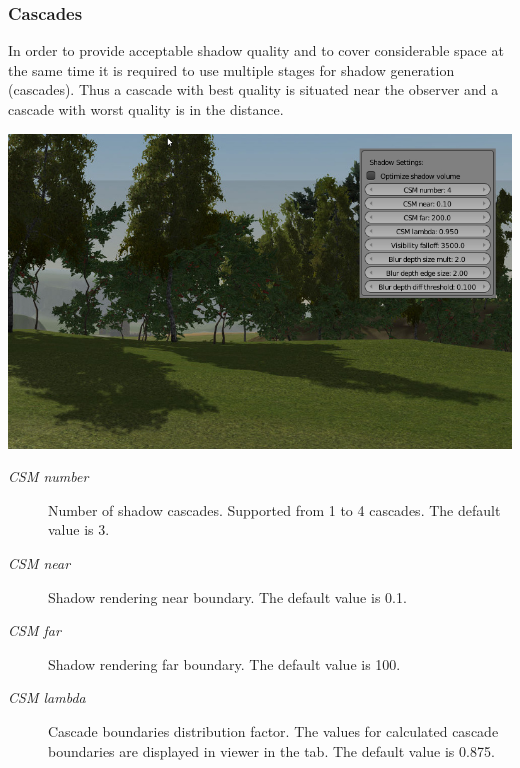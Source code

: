 \documentclass[a4paper,12pt,oneside]{sphinxmanual}
\begin{document}
\subsubsection{Cascades}
\label{lighting:id11}
In order to provide acceptable shadow quality and to cover considerable space at the same time it is required to use multiple stages for shadow generation (cascades). Thus a cascade with best quality is situated near the observer and a cascade with worst quality is in the distance.

{\hfill\includegraphics[width=1.000\linewidth]{shadow_cascades.jpg}\hfill}

\begin{DUlineblock}{0em}
\item[] 
\end{DUlineblock}
\begin{description}
\item[{\emph{CSM number}}] \leavevmode
Number of shadow cascades. Supported from 1 to 4 cascades. The default value is 3.

\item[{\emph{CSM near}}] \leavevmode
Shadow rendering near boundary. The default value is 0.1.

\item[{\emph{CSM far}}] \leavevmode
Shadow rendering far boundary. The default value is 100.

\item[{\emph{CSM lambda}}] \leavevmode
Cascade boundaries distribution factor. The values for calculated cascade boundaries are displayed in viewer in the  tab. The default value is 0.875.

\end{description}
\end{document}
